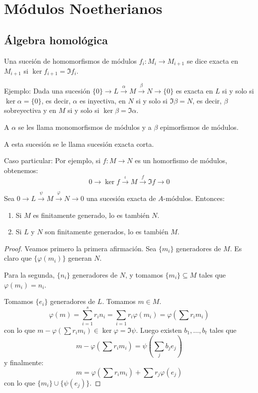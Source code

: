 \section{Módulos Noetherianos}
\subsection{Álgebra homológica}

\begin{df}
  Una suceión de homomorfismos de módulos \(f_i:M_i\longrightarrow
  M_{i+1}\) se dice exacta en
  \(M_{i+1}\) si \(\ker f_{i+1}=\Im f_i\).
\end{df}

Ejemplo: Dada una sucesión \(\{0\}\longrightarrow L 
\overset{\alpha}{\longrightarrow} M 
\overset{\beta}{\longrightarrow} N\longrightarrow \{0\}\)
es exacta en \(L\) si y solo si \(\ker \alpha=\{0\}\), es decir,
\(\alpha\) es inyectiva, en \(N\) si y solo si \(\Im \beta = N\),
es decir, \(\beta\) sobreyectiva y en \(M\) si y solo si
\(\ker\beta=\Im\alpha\).

A \(\alpha\) se les llama monomorfismos de módulos y a
\(\beta\) epimorfismos de módulos.

A esta sucesión se le llama sucesión exacta corta.

Caso particular: Por ejemplo, si \(f:M\longrightarrow N\) es
un homorfismo de módulos, obtenemos:
\[
  0\longrightarrow\ker f\overset{\iota}{\longrightarrow}
  M \overset{f}{\longrightarrow}\Im f
  \longrightarrow 0
\]

\begin{prop}
  Sea \(0\longrightarrow L\overset{\psi}{\longrightarrow} M
  \overset{\varphi}{\longrightarrow}
  N\longrightarrow 0\) una sucesión exacta de \(A\)-módulos. Entonces:
  \begin{enumerate}
    \item Si \(M\) es finitamente generado, lo es también \(N\).
    \item Si \(L\) y \(N\) son finitamente generados, lo es también \(M\).
  \end{enumerate}
\end{prop}

\begin{proof}
  Veamos primero la primera afirmación. Sea \(\{m_i\}\) generadores de \(M\).
  Es claro que \(\{\varphi(m_i)\}\) generan \(N\).

  Para la segunda, \(\{n_i\}\) generadores de \(N\), y tomamos
  \(\{m_i\}\subseteq M\) tales que \(\varphi(m_i)= n_i\).

  Tomamos \(\{e_i\}\) generadores de \(L\). Tomamos \(m\in M\).
  \[
    \varphi(m)=\sum_{i=1}^s r_i n_i = \sum_{i=1} r_i\varphi(m_i)
    =\varphi\left(\sum r_i m_i\right)
  \]
  con lo que \(m-\varphi(\sum r_i m_i)\in\ker\varphi=\Im\psi\).
  Luego existen \(b_1,\ldots, b_t\) tales que
  \[
    m-\varphi\left(\sum r_i m_i\right)=
    \psi\left(\sum_j b_j e_j\right)
  \]
  y finalmente:
  \[
    m=\varphi\left(\sum r_i m_i\right)+\sum r_j \varphi(e_j)
  \]
  con lo que \(\{m_i\}\cup\{\psi(e_j)\}\).
\end{proof}

